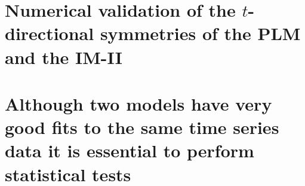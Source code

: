 \documentclass[12pt]{article}
\begin{document}


\section{Numerical validation of the $t$-directional  symmetries of the PLM and the IM-II}



\section{Although two models have very good fits to the same time series data it is essential to perform statistical tests}




%

\newpage
 


\end{document}

